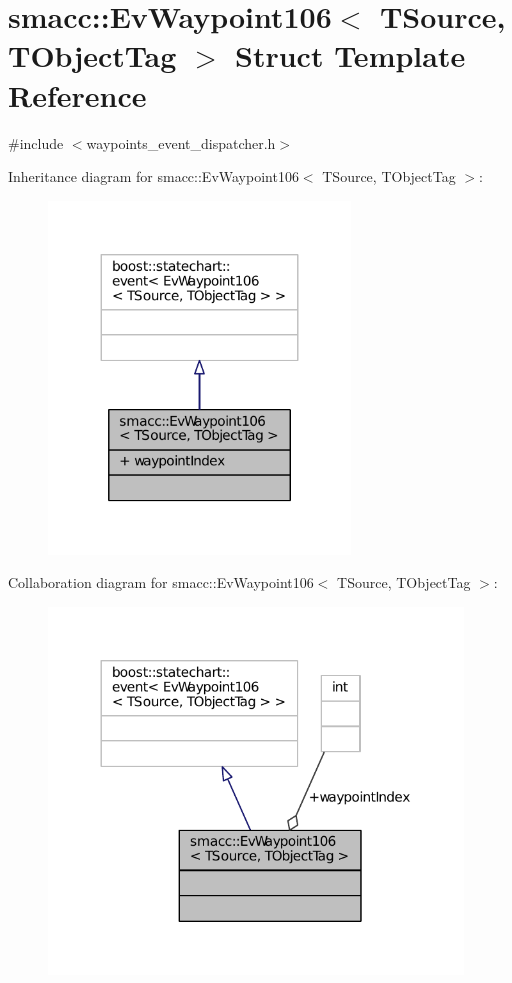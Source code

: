 \hypertarget{structsmacc_1_1EvWaypoint106}{}\section{smacc\+:\+:Ev\+Waypoint106$<$ T\+Source, T\+Object\+Tag $>$ Struct Template Reference}
\label{structsmacc_1_1EvWaypoint106}


{\ttfamily \#include $<$waypoints\+\_\+event\+\_\+dispatcher.\+h$>$}



Inheritance diagram for smacc\+:\+:Ev\+Waypoint106$<$ T\+Source, T\+Object\+Tag $>$\+:
\nopagebreak
\begin{figure}[H]
\begin{center}
\leavevmode
\includegraphics[width=227pt]{structsmacc_1_1EvWaypoint106__inherit__graph}
\end{center}
\end{figure}


Collaboration diagram for smacc\+:\+:Ev\+Waypoint106$<$ T\+Source, T\+Object\+Tag $>$\+:
\nopagebreak
\begin{figure}[H]
\begin{center}
\leavevmode
\includegraphics[width=312pt]{structsmacc_1_1EvWaypoint106__coll__graph}
\end{center}
\end{figure}
